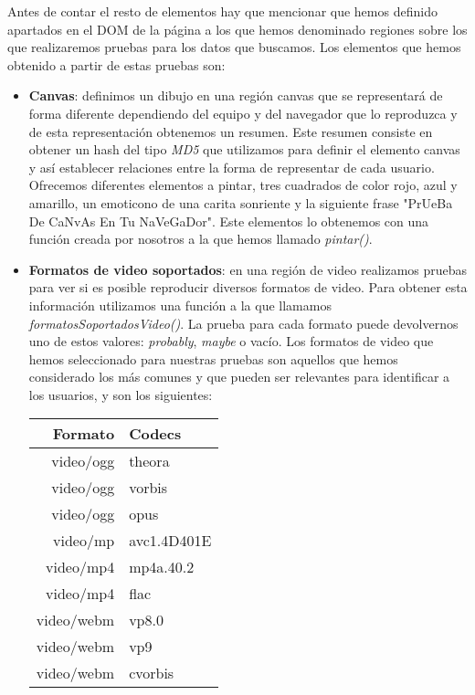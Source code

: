 \noindent  Antes de contar el resto de elementos hay que mencionar que hemos definido apartados en el DOM de la página a los que hemos denominado regiones sobre los que realizaremos pruebas para los datos que buscamos. Los elementos que hemos obtenido a partir de estas pruebas son:
\begin{itemize} 
    \item \textbf{Canvas}: definimos un dibujo en una región canvas que se representará de forma diferente dependiendo del equipo y del navegador que lo reproduzca y de esta representación obtenemos un resumen. Este resumen consiste en obtener un hash del tipo \textit{MD5} que utilizamos para definir el elemento canvas y así establecer relaciones entre la forma de representar de cada usuario. Ofrecemos diferentes elementos a pintar, tres cuadrados de color rojo, azul y amarillo, un emoticono de una carita sonriente y la siguiente frase "PrUeBa De CaNvAs En Tu NaVeGaDor". Este elementos lo obtenemos con una función creada por nosotros a la que hemos llamado \textit{pintar()}.
    \item \textbf{Formatos de video soportados}: en una región de video realizamos pruebas para ver si es posible reproducir diversos formatos de video. Para obtener esta información utilizamos una función a la que llamamos \textit{formatosSoportadosVideo()}. La prueba para cada formato puede devolvernos uno de estos valores: \textit{probably}, \textit{maybe} o vacío. Los formatos de video que hemos seleccionado para nuestras pruebas son aquellos que hemos considerado los más comunes y que pueden ser relevantes para identificar a los usuarios, y son los siguientes:
    \begin{table}[H]
        \begin{center}
            \begin{tabular}{ r | l }
            \textbf{Formato} & \textbf{Codecs} \\ \hline
            video/ogg & theora \\
            video/ogg & vorbis \\
            video/ogg & opus \\
            video/mp & avc1.4D401E \\
            video/mp4 & mp4a.40.2 \\
            video/mp4 & flac \\
            video/webm & vp8.0 \\
            video/webm & vp9 \\
            video/webm & cvorbis \\

\end{tabular}
\end{center}
\end{table}
\end{itemize}
